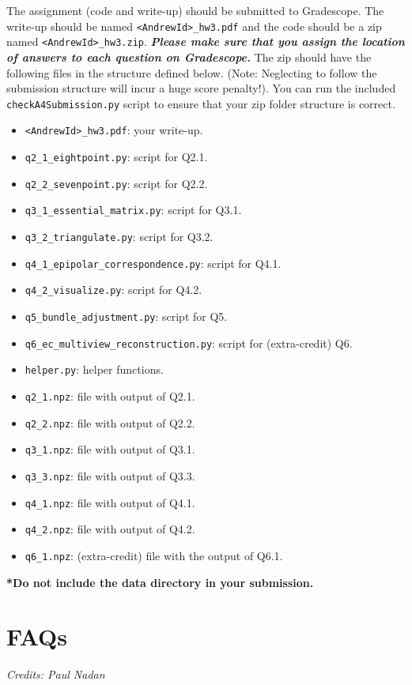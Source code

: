\documentclass[11pt]{article}
\begin{document}
The assignment (code and write-up) should be submitted to Gradescope. The write-up should be named \texttt{<AndrewId>\_hw3.pdf} and the code should be a zip named \texttt{<AndrewId>\_hw3.zip}. \textbf{\textit{Please make sure that you assign the location of answers to each question on Gradescope.}} The zip should have the following files in the structure defined below. (Note: Neglecting to follow the submission structure will incur a huge score penalty!). You can run the included \texttt{checkA4Submission.py} script to ensure that your zip folder structure is correct.
\begin{itemize}
  \item \texttt{<AndrewId>\_hw3.pdf}: your write-up.
  \item \texttt{q2\_1\_eightpoint.py}: script for Q2.1.
  \item \texttt{q2\_2\_sevenpoint.py}: script for Q2.2.
  \item \texttt{q3\_1\_essential\_matrix.py}: script for Q3.1.
  \item \texttt{q3\_2\_triangulate.py}: script for Q3.2.
  \item \texttt{q4\_1\_epipolar\_correspondence.py}: script for Q4.1.
  \item \texttt{q4\_2\_visualize.py}: script for Q4.2.
  \item \texttt{q5\_bundle\_adjustment.py}: script for Q5.
  \item \texttt{q6\_ec\_multiview\_reconstruction.py}: script for (extra-credit) Q6.
  \item \texttt{helper.py}: helper functions.
  \item \texttt{q2\_1.npz}: file with output of Q2.1.
  \item \texttt{q2\_2.npz}: file with output of Q2.2.
  \item \texttt{q3\_1.npz}: file with output of Q3.1.
  \item \texttt{q3\_3.npz}: file with output of Q3.3.
  \item \texttt{q4\_1.npz}: file with output of Q4.1.
  \item \texttt{q4\_2.npz}: file with output of Q4.2.
  \item \texttt{q6\_1.npz}: (extra-credit) file with the output of Q6.1.
\end{itemize}
\textbf{*Do not include the data directory in your submission.}


\section{FAQs} \emph{Credits: Paul Nadan}
\label{sec:faqs}
\end{document}

